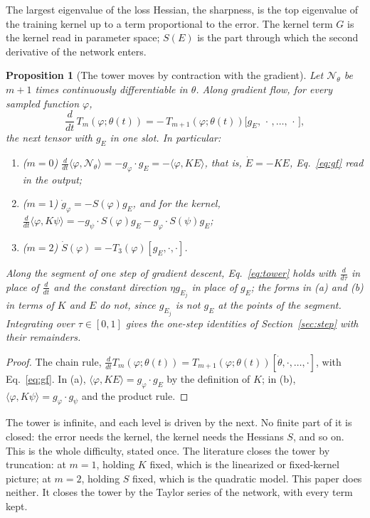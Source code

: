 \documentclass[11pt]{article}
\newtheorem{proposition}{Proposition}
\theoremstyle{definition}
\theoremstyle{remark}
\newcommand{\Net}{\mathcal{N}_\theta}    %
\newcommand{\ip}[2]{\langle #1,#2\rangle}
\begin{document}
The largest eigenvalue of the loss Hessian, the sharpness, is the top eigenvalue of the training kernel up to a term proportional to the error.
The kernel term $G$ is the kernel read in parameter space; $S(E)$ is the part through which the second derivative of the network enters.

\begin{proposition}[The tower moves by contraction with the gradient]\label{prop:tower}
Let $\Net$ be $m + 1$ times continuously differentiable in $\theta$.
Along gradient flow, for every sampled function $\varphi$,
\begin{equation}\label{eq:tower}
\frac{d}{dt}\,T_m(\varphi;\theta(t)) = -\,T_{m+1}(\varphi;\theta(t))\big[g_E,\,\cdot\,,\dots,\,\cdot\,\big],
\end{equation}
the next tensor with $g_E$ in one slot.
In particular:
\begin{enumerate}[label=(\alph*)]
\item ($m = 0$) $\frac{d}{dt}\ip{\varphi}{\Net} = -g_\varphi\cdot g_E = -\ip{\varphi}{KE}$, that is, $\dot E = -KE$, Eq.~\eqref{eq:gf} read in the output;
\item ($m = 1$) $\dot g_\varphi = -S(\varphi)g_E$, and for the kernel, $\frac{d}{dt}\ip{\varphi}{K\psi} = -g_\psi\cdot S(\varphi)g_E - g_\varphi\cdot S(\psi)g_E$;
\item ($m = 2$) $\dot S(\varphi) = -T_3(\varphi)[g_E,\cdot,\cdot]$.
\end{enumerate}
Along the segment of one step of gradient descent, Eq.~\eqref{eq:tower} holds with $\frac{d}{d\tau}$ in place of $\frac{d}{dt}$ and the constant direction $\eta g_{E_j}$ in place of $g_E$; the forms in (a) and (b) in terms of $K$ and $E$ do not, since $g_{E_j}$ is not $g_E$ at the points of the segment. Integrating over $\tau\in[0,1]$ gives the one-step identities of Section~\ref{sec:step} with their remainders.
\end{proposition}

\begin{proof}
The chain rule, $\frac{d}{dt}T_m(\varphi;\theta(t)) = T_{m+1}(\varphi;\theta(t))[\dot\theta,\cdot,\dots,\cdot]$, with Eq.~\eqref{eq:gf}.
In (a), $\ip{\varphi}{KE} = g_\varphi\cdot g_E$ by the definition of $K$; in (b), $\ip{\varphi}{K\psi} = g_\varphi\cdot g_\psi$ and the product rule.
\end{proof}

The tower is infinite, and each level is driven by the next.
No finite part of it is closed: the error needs the kernel, the kernel needs the Hessians $S$, and so on.
This is the whole difficulty, stated once.
The literature closes the tower by truncation: at $m = 1$, holding $K$ fixed, which is the linearized or fixed-kernel picture; at $m = 2$, holding $S$ fixed, which is the quadratic model.
This paper does neither.
It closes the tower by the Taylor series of the network, with every term kept.
\end{document}
